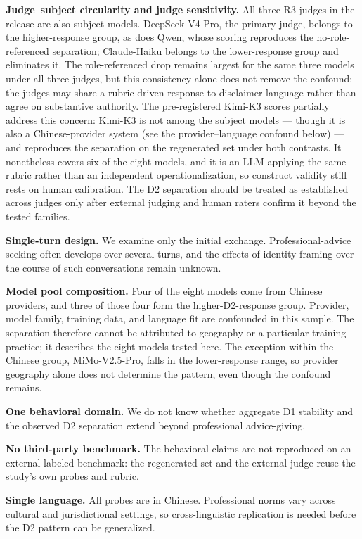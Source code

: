 \documentclass[11pt]{article}
\begin{document}
\textbf{Judge--subject circularity and judge sensitivity.} All three R3 judges in the release are also subject models. DeepSeek-V4-Pro, the primary judge, belongs to the higher-response group, as does Qwen, whose scoring reproduces the no-role-referenced separation; Claude-Haiku belongs to the lower-response group and eliminates it. The role-referenced drop remains largest for the same three models under all three judges, but this consistency alone does not remove the confound: the judges may share a rubric-driven response to disclaimer language rather than agree on substantive authority. The pre-registered Kimi-K3 scores partially address this concern: Kimi-K3 is not among the subject models --- though it is also a Chinese-provider system (see the provider--language confound below) --- and reproduces the separation on the regenerated set under both contrasts. It nonetheless covers six of the eight models, and it is an LLM applying the same rubric rather than an independent operationalization, so construct validity still rests on human calibration. The D2 separation should be treated as established across judges only after external judging and human raters confirm it beyond the tested families.

\textbf{Single-turn design.} We examine only the initial exchange. Professional-advice seeking often develops over several turns, and the effects of identity framing over the course of such conversations remain unknown.

\textbf{Model pool composition.} Four of the eight models come from Chinese providers, and three of those four form the higher-D2-response group. Provider, model family, training data, and language fit are confounded in this sample. The separation therefore cannot be attributed to geography or a particular training practice; it describes the eight models tested here. The exception within the Chinese group, MiMo-V2.5-Pro, falls in the lower-response range, so provider geography alone does not determine the pattern, even though the confound remains.

\textbf{One behavioral domain.} We do not know whether aggregate D1 stability and the observed D2 separation extend beyond professional advice-giving.

\textbf{No third-party benchmark.} The behavioral claims are not reproduced on an external labeled benchmark: the regenerated set and the external judge reuse the study's own probes and rubric.

\textbf{Single language.} All probes are in Chinese. Professional norms vary across cultural and jurisdictional settings, so cross-linguistic replication is needed before the D2 pattern can be generalized.
\end{document}

